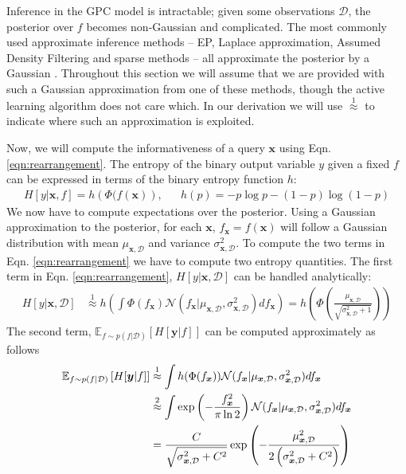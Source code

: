 \documentclass{article}
\newcommand{\x}{\bm{x}}
\newcommand{\y}{\bm{y}}
\newcommand{\data}{\mathcal{D}}
\newcommand{\E}{\mathbb{E}}
\begin{document}
Inference in the GPC model is intractable; given some observations $\data$, the posterior over $f$ becomes non-Gaussian and complicated. The most commonly used approximate inference methods -- EP,  Laplace approximation, Assumed Density Filtering and sparse methods -- all approximate the posterior by a Gaussian \cite{Rasmussen2006}. Throughout this section we will assume that we are provided with such a Gaussian approximation from one of these methods, though the active learning algorithm does not care which. In our derivation we will use {\scriptsize$\stackrel{1}{\approx}$} to indicate where such an approximation is exploited.

Now, we will compute the informativeness of a query $\x$ using Eqn.  \eqref{eqn:rearrangement}.  The entropy of the binary output variable $y$ given a fixed $f$ can be expressed in terms of the binary entropy function $h$: 
\begin{align}
H[y\vert\x,f] = h\left(\Phi(f(\x)\right), && h(p)=- p\log p - (1-p)\log(1-p)
\end{align}
We now have to compute expectations over the posterior. Using a Gaussian approximation to the posterior, for each $\x$, $f_{\x} = f(\x)$ will follow a Gaussian distribution with mean $\mu_{\x,\data}$ and variance $\sigma_{\x,\data}^2$. To compute the two terms in Eqn. \eqref{eqn:rearrangement} we have to compute two entropy quantities. The first term in Eqn. \eqref{eqn:rearrangement}, $H[y\vert\x,\data]$ can be handled analytically:
\begin{align}
	H[y\vert\x,\data] &\stackrel{1}{\approx} h\left( \int \Phi( f_{\x} )  \mathcal{N}(f_{\x}\vert \mu_{\x,\data},\sigma_{\x,\data}^2) df_{\x} \right)  = h \left( \Phi\left( \frac{\mu_{\x,\data}}{\sqrt{\sigma^2_{\x,\data} + 1}} \right)\right)\label{ent_mean}
\end{align}
The second term, $\E_{f \sim p(f\vert\data)} \left[ H[\y\vert f] \right]$ can be computed approximately as follows
\begin{align}
	\E_{f \sim p(f\vert\data)} \left[ H[\y\vert f] \right] &\stackrel{1}{\approx}\int h(\Phi(f_{\x})) \mathcal{N}(f_{\x}\vert \mu_{\x,\data},\sigma_{\x,\data}^2)df_{\x}\label{eqn:mean_entropy}\\
	&\stackrel{2}{\approx} \int \exp\left(-\frac{f_{\x}^2}{\pi\ln2}\right) \mathcal{N}(f_{\x}\vert \mu_{\x,\data},\sigma_{\x,\data}^2)df_{\x}\notag\\	
	&= \frac{C}{\sqrt{\sigma_{\x,\data}^2 + C^2}}\exp\left(-\frac{\mu_{\x,\data}^2}{2\left(\sigma_{\x,\data}^2 + C^2\right)}\right)\notag
\end{align}
\end{document}
